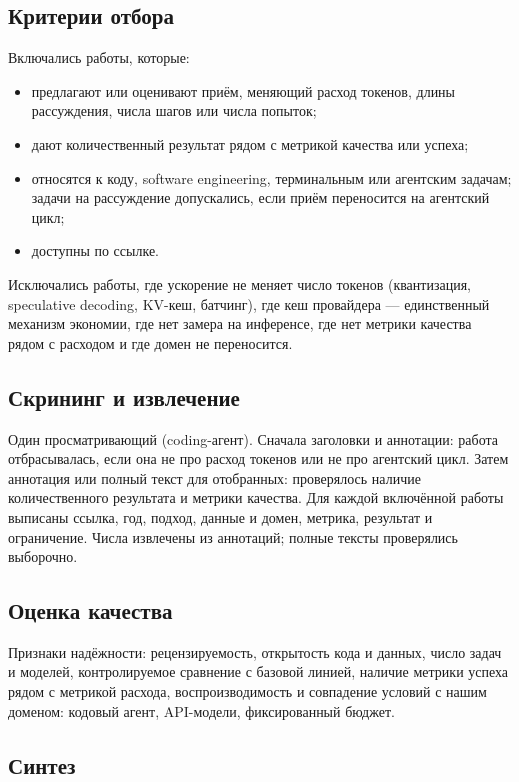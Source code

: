 \documentclass[11pt,a4paper]{article}
\begin{document}
\subsection{Критерии отбора}

Включались работы, которые:

\begin{itemize}
  \item предлагают или оценивают приём, меняющий расход токенов, длины
        рассуждения, числа шагов или числа попыток;
  \item дают количественный результат рядом с метрикой качества или успеха;
  \item относятся к коду, software engineering, терминальным или агентским
        задачам; задачи на рассуждение допускались, если приём переносится
        на агентский цикл;
  \item доступны по ссылке.
\end{itemize}

Исключались работы, где ускорение не меняет число токенов (квантизация,
speculative decoding, KV-кеш, батчинг), где кеш провайдера — единственный
механизм экономии, где нет замера на инференсе, где нет метрики качества
рядом с расходом и где домен не переносится.

\subsection{Скрининг и извлечение}

Один просматривающий (coding-агент). Сначала заголовки и аннотации: работа
отбрасывалась, если она не про расход токенов или не про агентский цикл.
Затем аннотация или полный текст для отобранных: проверялось наличие
количественного результата и метрики качества. Для каждой включённой работы
выписаны ссылка, год, подход, данные и домен, метрика, результат и
ограничение. Числа извлечены из аннотаций; полные тексты проверялись
выборочно.

\subsection{Оценка качества}

Признаки надёжности: рецензируемость, открытость кода и данных, число задач
и моделей, контролируемое сравнение с базовой линией, наличие метрики
успеха рядом с метрикой расхода, воспроизводимость и совпадение условий с
нашим доменом: кодовый агент, API-модели, фиксированный бюджет.

\subsection{Синтез}
\end{document}
